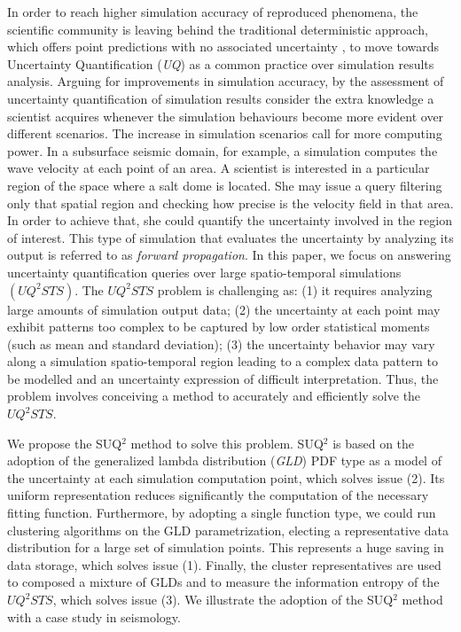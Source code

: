 \documentclass[11pt]{article}
\begin{document}
In order to reach higher simulation accuracy
of reproduced phenomena, the scientific community is leaving behind the traditional deterministic approach, which  offers  point predictions with no associated uncertainty \cite{Johnstone2015},  to move towards Uncertainty Quantification (\textit{UQ}) as a common practice over simulation results analysis. Arguing for improvements in simulation accuracy, by the assessment of uncertainty quantification of simulation results consider the extra knowledge a scientist acquires whenever the simulation behaviours become more evident over different scenarios. The increase in simulation scenarios call for more computing power.
In a subsurface seismic domain, for example, a simulation computes the wave velocity at each point of an area. A scientist is interested in a particular region of the space where a salt dome is located. She may issue a query filtering only that spatial region and checking how precise is the velocity field in that area. In order to achieve that, she could quantify the uncertainty involved in the region of interest. This type of simulation that evaluates the uncertainty by analyzing its output is referred to as \emph{forward propagation}.
In this paper, we focus on answering uncertainty quantification queries over large spatio-temporal simulations $(UQ^2STS)$.  
The $UQ^2STS$ problem is challenging as: (1) it requires analyzing large amounts of simulation output data; (2) the uncertainty at each point may exhibit patterns too complex to be captured  by low order statistical moments (such as mean and standard deviation); (3) the uncertainty behavior may vary along a simulation spatio-temporal region leading to a complex data pattern to be modelled and an uncertainty expression of difficult interpretation. Thus, the problem involves conceiving a method to accurately and efficiently solve the $UQ^2STS$.

We propose the SUQ$^2$ method to solve this problem. SUQ$^2$ is based on the adoption of the generalized lambda distribution (\textit{GLD}) PDF type as a model of the uncertainty at each simulation computation point, which solves issue (2). Its uniform representation reduces significantly the computation of the necessary fitting function. Furthermore, by adopting a single function type, we could run clustering algorithms on the GLD parametrization, electing a representative data distribution for a large set of simulation points. This represents a huge saving in data storage, which solves issue (1). Finally, the cluster representatives are used to composed a mixture of GLDs  and to measure the information entropy of the $UQ^2STS$, which solves issue (3).  We illustrate the adoption of the SUQ$^2$ method with a case study in seismology. 
\end{document}
